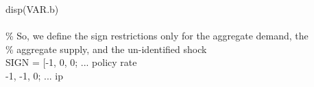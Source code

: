 \hspace{1mm}\hspace{5mm} \hspace{5mm} \hspace{5mm} \hspace{5mm} \hspace{5mm} disp(VAR.b) \\ 
\hspace{1mm}\hspace{5mm} \hspace{5mm} \hspace{5mm} \hspace{5mm} \hspace{5mm}  \\ 
\hspace{1mm}\hspace{5mm} \hspace{5mm} \hspace{5mm} \hspace{5mm} \hspace{5mm} \textcolor{matlabgreen}{\% So, we define the sign restrictions only \textcolor{matlabblue}{for} the aggregate demand, the  }\\ 
\hspace{1mm}\hspace{5mm} \hspace{5mm} \hspace{5mm} \hspace{5mm} \hspace{5mm} \hspace{5mm} \textcolor{matlabgreen}{\% aggregate supply, and the un-identified shock }\\ 
\hspace{1mm}\hspace{5mm} \hspace{5mm} \hspace{5mm} \hspace{5mm} \hspace{5mm} \hspace{5mm} SIGN = [-1,       0,      0;        ... policy rate \\ 
\hspace{1mm}\hspace{5mm} \hspace{5mm} \hspace{5mm} \hspace{5mm} \hspace{5mm} \hspace{5mm} -1,      -1,      0;        ... ip         \\ 
